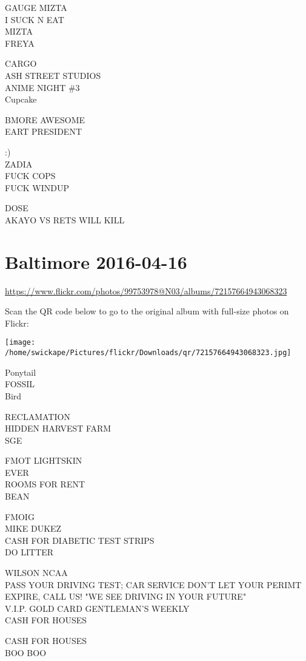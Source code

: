 \documentclass[10pt,letterpaper]{article}
\begin{document}
GAUGE MIZTA\\
I SUCK N EAT\\
MIZTA\\
FREYA

CARGO\\
ASH STREET STUDIOS\\
ANIME NIGHT \#3\\
Cupcake

BMORE AWESOME\\
EART PRESIDENT

:)\\
ZADIA\\
FUCK COPS\\
FUCK WINDUP

DOSE\\
AKAYO VS RETS WILL KILL
\pagebreak

\section*{Baltimore 2016-04-16}

\url{https://www.flickr.com/photos/99753978@N03/albums/72157664943068323}

Scan the QR code below to go to the original album with full-size photos on Flickr:

\texttt{[image: /home/swickape/Pictures/flickr/Downloads/qr/72157664943068323.jpg]}
\pagebreak

Ponytail\\
FOSSIL\\
Bird

RECLAMATION\\
HIDDEN HARVEST FARM\\
SGE

FMOT LIGHTSKIN\\
EVER\\
ROOMS FOR RENT\\
BEAN

FMOIG\\
MIKE DUKEZ\\
CASH FOR DIABETIC TEST STRIPS\\
DO LITTER

WILSON NCAA\\
PASS YOUR DRIVING TEST; CAR SERVICE DON'T LET YOUR PERIMT EXPIRE, CALL US!  "WE SEE DRIVING IN YOUR FUTURE"\\
V.I.P. GOLD CARD GENTLEMAN'S WEEKLY\\
CASH FOR HOUSES

CASH FOR HOUSES\\
BOO BOO
\end{document}

